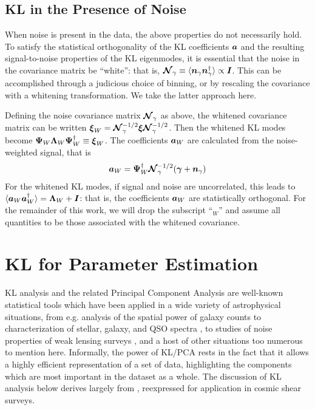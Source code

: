 \subsection{KL in the Presence of Noise}
\label{Adding_Noise}
When noise is present in the data, the above properties do not 
necessarily hold.
To satisfy the statistical orthogonality of the KL coefficients $\boldsymbol{a}$ 
and the resulting signal-to-noise properties of the KL eigenmodes, 
it is essential that the noise in the covariance matrix be ``white'': 
that is, $\boldsymbol{\mathcal{N}}_\gamma \equiv 
\langle \boldsymbol{n}_\gamma\boldsymbol{n}_\gamma^\dagger \rangle \propto \boldsymbol{I}$.  
This can be accomplished through a judicious
choice of binning, or by rescaling the covariance with a whitening 
transformation.  We take the latter approach here.

Defining the noise covariance matrix $\boldsymbol{\mathcal{N}}_\gamma$ as above,
the whitened covariance matrix can be written 
$\boldsymbol{\xi}_W = \boldsymbol{\mathcal{N}}_\gamma^{-1/2} \boldsymbol{\xi} \boldsymbol{\mathcal{N}}_\gamma^{-1/2}$.  Then 
the whitened KL modes become
$\boldsymbol{\Psi}_W\boldsymbol{\Lambda}_W\boldsymbol{\Psi}_W^\dagger \equiv \boldsymbol{\xi}_W$.
The coefficients $\boldsymbol{a}_W$ are calculated from the noise-weighted signal,
that is
\begin{equation}
  \boldsymbol{a}_W = \boldsymbol{\Psi}_W^\dagger\boldsymbol{\mathcal{N}}_\gamma^{-1/2}
  (\boldsymbol{\gamma}+\boldsymbol{n}_\gamma)
\end{equation}
For the whitened KL modes, if signal and noise are uncorrelated, this leads to 
$\langle\boldsymbol{a}_W\boldsymbol{a}_W^\dagger\rangle = \boldsymbol{\Lambda}_W + \boldsymbol{I}$:
that is, the coefficients $\boldsymbol{a}_W$ are statistically orthogonal.
For the remainder of this work, we will drop the subscript ``$_W$'' and assume
all quantities to be those associated with the whitened covariance.



\section{KL for Parameter Estimation}
\label{sec:kl_intro}
KL analysis and the related Principal Component Analysis are well-known
statistical tools which have been applied in a wide variety of astrophysical
situations, from e.g. analysis of the spatial power of galaxy counts
\citep{Vogeley96, Szalay03, Pope04}
to characterization of stellar, galaxy, and QSO spectra
\citep{Connolly95, Connolly99, Yip04a, Yip04b},
to studies of noise properties of weak lensing surveys
\citep{Kilbinger06, Munshi06}, and a host of other situations too numerous
to mention here.  Informally, the power of KL/PCA rests in the fact that 
it allows a highly efficient representation of a set of data, highlighting
the components which are most important in the dataset as a whole.
The discussion of KL analysis below derives largely from \citet{Vogeley96},
reexpressed for application in cosmic shear surveys.

